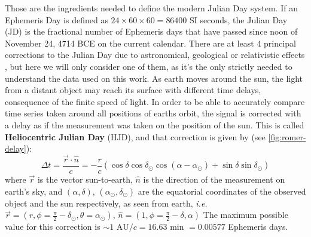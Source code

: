 	Those are the ingredients needed to define the modern Julian Day system. If an Ephemeris Day is defined as $24\times60\times60=86400$ SI seconds, 
	the Julian Day (JD) is the fractional number of Ephemeris days that have passed since noon of November 24, 4714 BCE on the current calendar. 
	There are at least 4 principal corrections to the Julian Day due to astronomical, geological or relativistic effects \citep{Eastman2010}, 
	but here we will only consider one of them, as it's the only strictly needed to understand the data used on this work.
	As earth moves around the sun, the light from a distant object may reach its surface with different time delays, consequence of the finite speed of light.
	In order to be able to accurately compare time series taken around all positions of earths orbit, 
	the signal is corrected with a delay as if the measurement was taken on the position of the sun.
	This is called \textbf{Heliocentric Julian Day} (HJD), and that correction is given by (see \autoref{fig:romer-delay}):
	\begin{equation}
		\Delta t = \frac{\vec{r}\cdot \hat{n}}{c} = - \frac{r}{c} \left(\cos\delta \cos \delta_{\odot}\cos(\alpha-\alpha_\odot)+ \sin\delta \sin \delta_\odot\right)
	\end{equation}
	where $\vec{r}$ is the vector sun-to-earth, $\hat{n}$ is the direction of the measurement on earth's sky, 
	and $(\alpha,\delta),\,(\alpha_\odot,\delta_\odot)$ are the equatorial coordinates of the observed object and the sun respectively, 
	as seen from earth, \textit{i.e.} $\vec{r} = (r,\phi=\frac\pi2-\delta_\odot,\theta=\alpha_\odot)$, $\hat n = (1,\phi=\frac\pi2-\delta,\alpha)$ 
	The maximum possible value for this correction is $\sim 1 \text{ AU}/c = 16.63 \text{ min } = 0.00577$ Ephemeris days.
	
